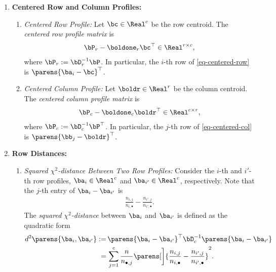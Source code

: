 \documentclass[12pt]{article}
\begin{document}
\begin{enumerate}[label=\textbf{\arabic*.}]
	\begin{proof}
		The results are obvious by noting $\bD^{-1}_c \bc = \boldone_{c}$ and $\bD^{-1}_r \boldr = \boldone_{r}$. 
	\end{proof}
	
	\item \textbf{Centered Row and Column Profiles:} 
	\begin{enumerate}
		\item \textit{Centered Row Profile:} Let $\bc \in \Real^c$ be the row centroid. The \emph{centered row profile matrix} is 
		\begin{align}\label{eq-centered-row}
			\bP_r - \boldone_r \bc^\top \in \Real^{r \times c}, 
		\end{align}
		where $\bP_r := \bD_r^{-1} \bP$. In particular, the $i$-th row of \eqref{eq-centered-row} is $\parens{\ba_i - \bc}^\top$. 
		
		\item \textit{Centered Column Profile:} Let $\boldr \in \Real^r$ be the column centroid. The \emph{centered column profile matrix} is 
		\begin{align}\label{eq-centered-col}
			\bP_c - \boldone_c \boldr^\top \in \Real^{c \times r}, 
		\end{align}
		where $\bP_c := \bD_c^{-1} \bP^\top$. In particular, the $j$-th row of \eqref{eq-centered-col} is $\parens{\bb_j - \boldr}^\top$. 
	\end{enumerate}
	
	\item \textbf{Row Distances:} 
	\begin{enumerate}
		\item \textit{Squared $\chi^2$-distance Between Two Row Profiles:} Consider the $i$-th and $i'$-th row profiles, $\ba_i \in \Real^c$ and $\ba_{i'} \in \Real^c$, respectively. Note that the $j$-th entry of $\ba_i - \ba_{i'}$ is 
		\begin{align*}
			\frac{n_{i,j}}{n_{i, \bullet}} - \frac{n_{i',j}}{n_{i', \bullet}}. 
		\end{align*}
		The \emph{squared $\chi^2$-distance} between $\ba_i$ and $\ba_{i'}$ is defined as the quadratic form 
		\begin{align*}
			d^2 \parens{\ba_i, \ba_{i'}} := & \, \parens{\ba_i - \ba_{i'}}^\top \bD_c^{-1} \parens{\ba_i - \ba_{i'}} \\ 
			= & \, \sum_{j=1}^c \frac{n}{n_{\bullet, j}} \parens[\bigg]{\frac{n_{i,j}}{n_{i, \bullet}} - \frac{n_{i',j}}{n_{i', \bullet}}}^2. 
		\end{align*}
		

\end{enumerate}
\end{enumerate}
\end{document}
